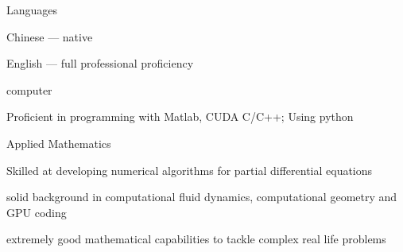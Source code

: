 
\begin{cvskills}
  \cvskill
    {Languages} %
    {
      \begin{cvitems} %
        \item {Chinese --- native}
        \item {English --- full professional proficiency}
      \end{cvitems}
    } %

  \cvskill
    {computer} %
    {
      \begin{cvitems} %
        \item {Proficient in programming with Matlab, CUDA C/C++; Using python}
      \end{cvitems}
    } %

    \cvskill
    {Applied Mathematics} %
    {
      \begin{cvitems} %
        \item {Skilled at developing numerical algorithms for partial differential equations}
        \item {solid background in computational fluid dynamics, computational geometry and GPU coding}
        \item {extremely good mathematical capabilities to tackle complex real life problems}
      \end{cvitems}
    } %

\end{cvskills}
